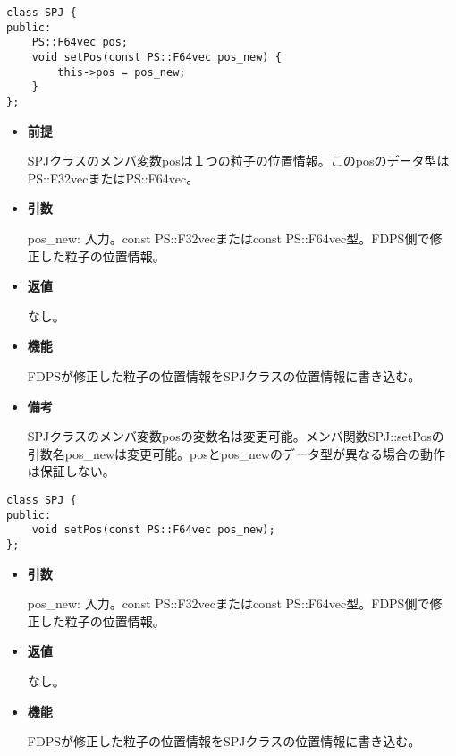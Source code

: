 
\begin{screen}
\begin{verbatim}
class SPJ {
public:
    PS::F64vec pos;
    void setPos(const PS::F64vec pos_new) {
        this->pos = pos_new;
    }
};
\end{verbatim}
\end{screen}

\begin{itemize}

\item {\bf 前提}
  
  SPJクラスのメンバ変数posは１つの粒子の位置情報。このposのデータ型は
  PS::F32vecまたはPS::F64vec。

\item {\bf 引数}

  pos\_new: 入力。const PS::F32vecまたはconst PS::F64vec型。FDPS側で修
  正した粒子の位置情報。

\item {\bf 返値}

  なし。
  
\item {\bf 機能}

  FDPSが修正した粒子の位置情報をSPJクラスの位置情報に書き込む。

\item {\bf 備考}

  SPJクラスのメンバ変数posの変数名は変更可能。メンバ関数SPJ::setPosの
  引数名pos\_newは変更可能。posとpos\_newのデータ型が異なる場合の動作
  は保証しない。

\end{itemize}
\fi

\begin{screen}
\begin{verbatim}
class SPJ {
public:
    void setPos(const PS::F64vec pos_new);
};
\end{verbatim}
\end{screen}

\begin{itemize}

\item {\bf 引数}

  pos\_new: 入力。const PS::F32vecまたはconst PS::F64vec型。FDPS側で修
  正した粒子の位置情報。

\item {\bf 返値}

  なし。
  
\item {\bf 機能}

  FDPSが修正した粒子の位置情報をSPJクラスの位置情報に書き込む。

\end{itemize}


